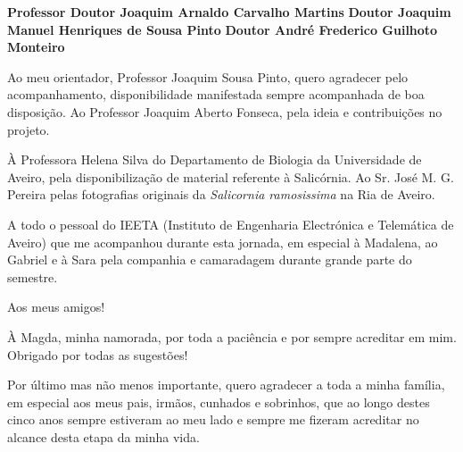 \documentclass[11pt,twoside,a4paper]{report}
\begin{document}
\TitlePage
  \vspace*{55mm}
       {}
       {\textbf{Professor Doutor Joaquim Arnaldo Carvalho Martins}}
  \vspace*{5mm}
       {\textbf{Doutor Joaquim Manuel Henriques de Sousa Pinto}}
  \vspace*{5mm}
  \TEXT{}
       {\textbf{Doutor André Frederico Guilhoto Monteiro
       		}}
\EndTitlePage
\titlepage\ \endtitlepage %

\TitlePage
  \vspace*{55mm}
{Ao meu orientador, Professor Joaquim Sousa Pinto, quero agradecer pelo acompanhamento, disponibilidade manifestada sempre acompanhada de boa disposição. Ao Professor Joaquim Aberto Fonseca, pela ideia e contribuições no projeto.} 

\TEXT{}
{À Professora Helena Silva do Departamento de Biologia da Universidade de Aveiro, pela disponibilização de material referente  à Salicórnia. Ao Sr. José M. G. Pereira pelas fotografias originais da \textit{Salicornia ramosissima} na Ria de Aveiro.}


\TEXT{}
{A todo o pessoal do IEETA (Instituto de Engenharia Electrónica e Telemática de Aveiro) que me acompanhou durante esta jornada, em especial à Madalena, ao Gabriel e à Sara pela companhia e camaradagem durante grande parte do semestre.}

\TEXT{}
{Aos meus amigos!}   

\TEXT{}
{À Magda, minha namorada, por toda a paciência e por sempre acreditar em mim. Obrigado por todas as sugestões!}




 

	
\TEXT{}
{Por último mas não menos importante, quero agradecer a toda a minha família, em especial aos meus pais, irmãos, cunhados e sobrinhos, que ao longo destes cinco anos sempre estiveram ao meu lado e sempre me fizeram acreditar no alcance desta etapa da minha vida. }
     
\end{document}
